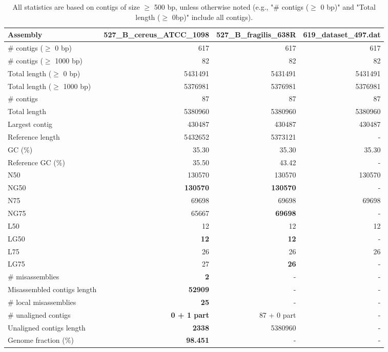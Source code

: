 \documentclass[12pt,a4paper]{article}
\begin{document}
\begin{table}[ht]
\begin{center}
\caption{All statistics are based on contigs of size $\geq$ 500 bp, unless otherwise noted (e.g., "\# contigs ($\geq$ 0 bp)" and "Total length ($\geq$ 0bp)" include all contigs).}
\begin{tabular}{|l*{3}{|r}|}
\hline
Assembly & 527\_B\_cereus\_ATCC\_1098 & 527\_B\_fragilis\_638R & 619\_dataset\_497.dat \\ \hline
\# contigs ($\geq$ 0 bp) & 617 & 617 & 617 \\ \hline
\# contigs ($\geq$ 1000 bp) & 82 & 82 & 82 \\ \hline
Total length ($\geq$ 0 bp) & 5431491 & 5431491 & 5431491 \\ \hline
Total length ($\geq$ 1000 bp) & 5376981 & 5376981 & 5376981 \\ \hline
\# contigs & 87 & 87 & 87 \\ \hline
Total length & 5380960 & 5380960 & 5380960 \\ \hline
Largest contig & 430487 & 430487 & 430487 \\ \hline
Reference length & 5432652 & 5373121 & - \\ \hline
GC (\%) & 35.30 & 35.30 & 35.30 \\ \hline
Reference GC (\%) & 35.50 & 43.42 & - \\ \hline
N50 & 130570 & 130570 & 130570 \\ \hline
NG50 & {\bf 130570} & {\bf 130570} & - \\ \hline
N75 & 69698 & 69698 & 69698 \\ \hline
NG75 & 65667 & {\bf 69698} & - \\ \hline
L50 & 12 & 12 & 12 \\ \hline
LG50 & {\bf 12} & {\bf 12} & - \\ \hline
L75 & 26 & 26 & 26 \\ \hline
LG75 & 27 & {\bf 26} & - \\ \hline
\# misassemblies & {\bf 2} & - & - \\ \hline
Misassembled contigs length & {\bf 52909} & - & - \\ \hline
\# local misassemblies & {\bf 25} & - & - \\ \hline
\# unaligned contigs & {\bf 0 + 1 part} & 87 + 0 part & - \\ \hline
Unaligned contigs length & {\bf 2338} & 5380960 & - \\ \hline
Genome fraction (\%) & {\bf 98.451} & - & - \\ \hline

\end{tabular}
\end{center}
\end{table}
\end{document}
